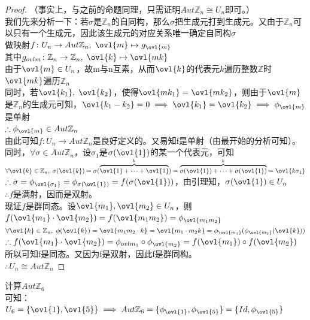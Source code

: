 \begin{proof}
（事实上，与之前的命题同理，只需证明$Aut\mathbb{Z}_n\cong U_n$即可。）\\
我们先来分析一下：若$\sigma$是$\mathbb{Z}_n$的自同构，那么$\sigma$把生成元打到生成元。又由于$\mathbb{Z}_n$可以只有一个生成元，因此该生成元的对应关系唯一确定自同构$\sigma$\\
做映射$f\colon U_n\to Aut\mathbb{Z}_n,\; \ovl{m}\mapsto g_{\ovl{m}}$\\
其中$g_{ovl{m}}\colon \mathbb{Z}_n\to\mathbb{Z}_n,\; \ovl{k}\mapsto \ovl{mk}$\\
由于$\ovl{m}\in U_n$，故m与n互素，从而$\ovl{k}$的代表元$k$遍历整数$\mathbb{Z}$时$\ovl{mk}$遍历$\mathbb{Z}_n$\\
同时，若$\ovl{k_1},\; \ovl{k_2}$，使得$\ovl{mk_1}=\ovl{mk_2}$，则由于$\ovl{m}$是$\mathbb{Z}_n$的生成元可知，$\ovl{k_1-k_2}=0\implies \ovl{k_1}=\ovl{k_2}\implies \phi_{\ovl{m}}$是单射\\
$\therefore \phi_{\ovl{m}}\in Aut\mathbb{Z}_n$\\
由此可知$f\colon U_n\to Aut\mathbb{Z}_n$是良好定义的。又易知f是单射（由最开始的分析可知）。\\
同时，$\forall \sigma\in Aut\mathbb{Z}_n$，设$\sigma_1$是$\sigma(\ovl{1})$的某一个代表元，可知$\forall \ovl{k}\in \mathbb{Z}_n,\; \sigma(\ovl{k})=\sigma(\overbrace{\ovl{1}+\cdots +\ovl{1}}^k)=\overbrace{\sigma(\ovl{1})+\cdots +\sigma(\ovl{1})}^k=\ovl{k\sigma_1}$\\
$\therefore\sigma=\phi_{\ovl{\sigma_1}}=\phi_{\sigma(\ovl{1})}=f(\sigma(\ovl{1}))$，由引理知，$\sigma(\ovl{1})\in U_n$\\
$\therefore f$是满射，因而是双射。\\
现证$f$是群同态。设$\ovl{m_1},\ovl{m_2}\in U_n$，则$f(\ovl{m_1}\cdot\ovl{m_2})=f(\ovl{m_1m_2})=\phi_{\ovl{m_1m_2}}$\\
$\forall \ovl{k}\in \mathbb{Z}_n,\; \phi(\ovl{k})=\ovl{m_1m_2\cdot k}=\ovl{m_1\cdot m_2k}=\phi_{\ovl{m_1}}(\phi_{\ovl{m_2}}(\ovl{k}))$\\
$\therefore f(\ovl{m_1}\cdot\ovl{m_2})=\phi_{ovl{m_1}}\circ\phi_{\ovl{m_2}}=f(\ovl{m_1})\circ f(\ovl{m_2})$\\
所以可知f是同态。又因为f是双射，因此f是群同构。\\
$\therefore U_n\cong Aut\mathbb{Z}_n$
\end{proof}
计算$Aut\mathbb{Z}_6$\\
可知：$U_6=\{\ovl{1},\ovl{5}\}\implies Aut\mathbb{Z}_6=\{\phi_{\ovl{1}},\phi_{\ovl{5}}\}=\{Id,\phi_{\ovl{5}}\}$\\
